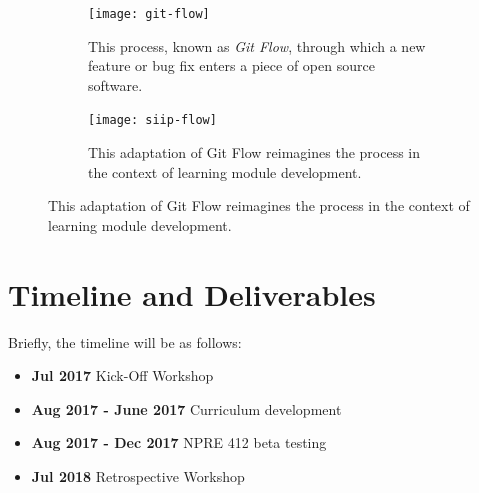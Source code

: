 \documentclass[11pt]{article}
\begin{document}
          \begin{figure}
                  \centering
                  \begin{subfigure}{.4\textwidth}
                            \centering
                            \texttt{[image: git-flow]}
          \caption{This process, known as \emph{Git Flow}, through which a new 
                          feature or bug fix enters a piece of open source 
                          software\cite{scopatz_effective_2015}.}
                                  \label{fig:sub1}
                  \end{subfigure}\hfill%
                  \begin{subfigure}{.4\textwidth}
                            \centering
                            \texttt{[image: siip-flow]}
          \caption{This adaptation of Git Flow reimagines the process in the context of learning module development.}
                                  \label{fig:sub2}
                  \end{subfigure}
                  \label{fig:test}
          \end{figure}
          \FloatBarrier

          \section{Timeline and Deliverables}
          Briefly, the timeline will be as follows:

          \begin{itemize}
                  \item \textbf{Jul 2017} Kick-Off Workshop
                  \item \textbf{Aug 2017 - June 2017} Curriculum development
                  \item \textbf{Aug 2017 - Dec 2017} NPRE 412 beta testing
                  \item \textbf{Jul 2018} Retrospective Workshop
          \end{itemize}
\end{document}
